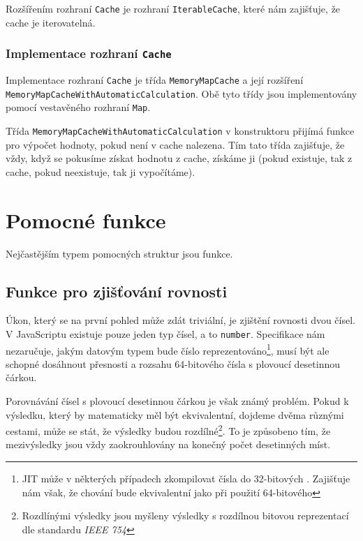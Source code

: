 Rozšířením rozhraní \texttt{Cache} je rozhraní \texttt{IterableCache}\cite[line 49 - 54]{geometryjs:source:interfaces:cache.ts}, které nám zajišťuje, že cache je iterovatelná.

\subsubsection[Implementace]{Implementace rozhraní \texttt{Cache}}
\label{subsubsec:helper-class-cache-implementation}

Implementace rozhraní \texttt{Cache} je třída \texttt{MemoryMapCache}\cite[line 7 - 33]{geometryjs:source:helpers:memoryMapCache.ts} a její rozšíření \texttt{MemoryMapCacheWithAutomaticCalculation}\cite[line 38 - 59]{geometryjs:source:helpers:memoryMapCache.ts}.
Obě tyto třídy jsou implementovány pomocí vestavěného rozhraní \texttt{Map}\cite{mdn:map}.

Třída \texttt{MemoryMapCacheWithAutomaticCalculation} v konstruktoru přijímá funkce pro výpočet hodnoty, pokud není v cache nalezena.
Tím tato třída zajišťuje, že vždy, když se pokusíme získat hodnotu z cache, získáme ji (pokud existuje, tak z cache, pokud neexistuje, tak ji vypočítáme)\cite{geometryjs:wiki:helpers}.

\section{Pomocné funkce}
\label{sec:helper-functions}

Nejčastějším typem pomocných struktur jsou funkce. 

\subsection[Rovnost]{Funkce pro zjišťování rovnosti}
\label{subsec:helper-function-equality}

Úkon, který se na první pohled může zdát triviální, je zjištění rovnosti dvou čísel.
V JavaScriptu existuje pouze jeden typ čísel, a to \texttt{number}.
Specifikace nám nezaručuje, jakým datovým typem bude číslo reprezentováno\footnote{JIT může v některých případech zkompilovat čísla do 32-bitových . Zajišťuje nám však, že chování bude ekvivalentní jako při použití 64-bitového }, musí být ale schopné dosáhnout přesnosti a rozsahu 64-bitového čísla s plovoucí desetinnou čárkou\cite{mdn:number}.

Porovnávání čísel s plovoucí desetinnou čárkou je však známý problém\cite{wikipedia:floating-point-arithmetic}.
Pokud k výsledku, který by matematicky měl být ekvivalentní, dojdeme dvěma různými cestami, může se stát, že výsledky budou rozdílné\footnote{Rozdlínými výsledky jsou myšleny výsledky s rozdílnou bitovou reprezentací dle standardu \textit{IEEE 754}\cite{wikipeadia:double-precision-floating-point-format}}.
To je způsobeno tím, že mezivýsledky jsou vždy zaokrouhlovány na konečný počet desetinných míst.

